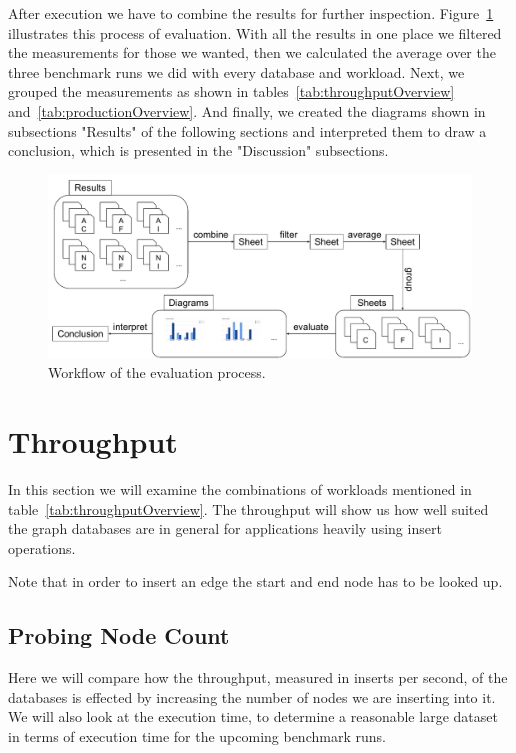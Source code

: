 After execution we have to combine the results for further inspection.
Figure~\ref{fig:evaluationWorkflow} illustrates this process of evaluation.
With all the results in one place we filtered the measurements for those we wanted,
then we calculated the average over the three benchmark runs we did with every database and workload.
Next,
we grouped the measurements as shown in tables~\ref{tab:throughputOverview} and~\ref{tab:productionOverview}.
And finally,
we created the diagrams shown in subsections "Results" of the following sections and interpreted them to draw a conclusion,
which is presented in the "Discussion" subsections.

\begin{figure}[!h]
  \includegraphics[width=\textwidth]{images/evaluationProcess}
  \caption{Workflow of the evaluation process.}
  \label{fig:evaluationWorkflow}
\end{figure}

\section{Throughput}
\label{ch:evaluation:se:throughput}
In this section we will examine the combinations of workloads mentioned in table~\ref{tab:throughputOverview}.
The throughput will show us how well suited the graph databases are in general for applications heavily using insert operations.

Note that in order to insert an edge the start and end node has to be looked up.

\subsection{Probing Node Count}
\label{ch:evaluation:se:probingNodeCount}
Here we will compare how the throughput,
measured in inserts per second,
of the databases is effected by increasing the number of nodes we are inserting into it.
We will also look at the execution time,
to determine a reasonable large dataset in terms of execution time for the upcoming benchmark runs.

